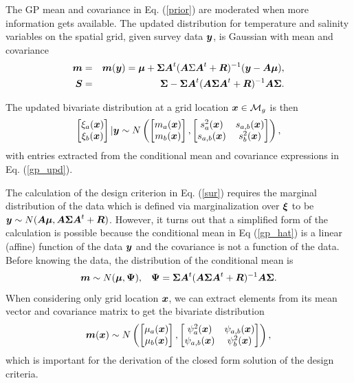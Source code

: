 \documentclass[aoas]{imsart}
\begin{document}
The GP mean and covariance in Eq. (\ref{prior}) are moderated when more information gets available. 
The updated distribution for temperature and salinity variables on the
spatial grid, given survey data ${\boldsymbol y}$, is Gaussian with mean and
covariance 
\begin{eqnarray}\label{gp_upd}
\bm &=& \bm(\by) = \bmu+\bSigma \bA^t (\bA \Sigma \bA^t+\bR)^{-1}(\by-\bA \bmu),  \\
\bS &=& \bSigma - \bSigma \bA^t (\bA \bSigma \bA^t+\bR)^{-1} \bA \bSigma.\nonumber
\end{eqnarray}

The updated bivariate distribution at a grid location ${\boldsymbol x} \in \mathcal{M}_g$ is then 
\begin{equation}\label{gp_hat}
\begin{bmatrix}
\xi_a(\bx) \\
\xi_b(\bx)
\end{bmatrix}
 |\by
 \sim N \left( 
\begin{bmatrix} m_{a}(\bx)\\
m_{b}(\bx)
\end{bmatrix},\begin{bmatrix}
s_{a}^2(\bx) & s_{a,b}(\bx)  \\
s_{a,b}(\bx)  & s_{b}^2(\bx)  
\end{bmatrix}
\right),
\end{equation}
with entries extracted from the conditional mean and covariance
expressions in Eq. (\ref{gp_upd}). 

The calculation of the design criterion in Eq. (\ref{sur}) requires the marginal distribution of the data which is defined via marginalization over ${\boldsymbol \xi}$ to be
${\boldsymbol y} \sim N( {\boldsymbol A} {\boldsymbol \mu},{\boldsymbol A} {\boldsymbol \Sigma} {\boldsymbol A}^t+{\boldsymbol R})$. 
However, it turns out that a simplified form of the calculation is possible because the 
conditional mean in Eq (\ref{gp_hat}) is a linear (affine) function of the data ${\boldsymbol y}$ and the covariance is not a function of the data.
Before knowing the data, the distribution of the conditional mean is
\begin{equation}\label{distxi} \bm \sim N(\bmu , \bPsi), \hspace{3mm}
  \bPsi=\bSigma \bA^t (\bA \bSigma \bA^t+\bR)^{-1} \bA \bSigma.
\end{equation} 
When considering only grid location ${\boldsymbol x}$, we can
extract elements from its mean vector and covariance matrix to get the
bivariate distribution \begin{equation}\label{dist_mxi} 
  \bm(\bx) \sim N \left( \begin{bmatrix}
      \mu_{a}(\bx) \\
      \mu_{b}(\bx) \end{bmatrix}, \begin{bmatrix}
      \psi^2_{a}(\bx) & \psi_{a,b}(\bx)\\
      \psi_{a,b}(\bx) & \psi^2_{b}(\bx) \end{bmatrix} \right),
\end{equation}
which is important for the derivation of the closed form solution of the design criteria.
\end{document}
